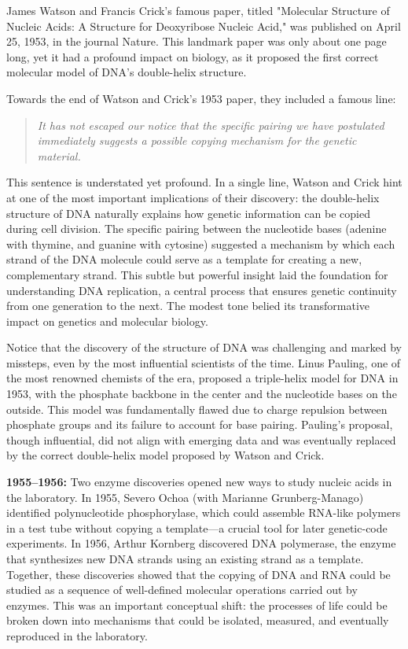 James Watson and Francis Crick's famous paper, titled "Molecular Structure of Nucleic Acids: A Structure for Deoxyribose Nucleic Acid," was published on April 25, 1953, in the journal Nature. This landmark paper was only about one page long, yet it had a profound impact on biology, as it proposed the first correct molecular model of DNA's double-helix structure.

Towards the end of Watson and Crick's 1953 paper, they included a famous line:
\begin{quote}
    \textit{It has not escaped our notice that the specific pairing we have postulated immediately suggests a possible copying mechanism for the genetic material.}
\end{quote}
This sentence is understated yet profound. In a single line, Watson and Crick hint at one of the most important implications of their discovery: the double-helix structure of DNA naturally explains how genetic information can be copied during cell division. The specific pairing between the nucleotide bases (adenine with thymine, and guanine with cytosine) suggested a mechanism by which each strand of the DNA molecule could serve as a template for creating a new, complementary strand. This subtle but powerful insight laid the foundation for understanding DNA replication, a central process that ensures genetic continuity from one generation to the next. The modest tone belied its transformative impact on genetics and molecular biology.

Notice that the discovery of the structure of DNA was challenging and marked by missteps, even by the most influential scientists of the time. Linus Pauling, 
one of the most renowned chemists of the era, proposed a triple-helix model for DNA in 1953, with the phosphate backbone in the center and the nucleotide bases on the outside. This model was fundamentally flawed due to charge repulsion between phosphate groups and its failure to account for base pairing. Pauling's proposal, though influential, did not align with emerging data and was eventually replaced by the correct double-helix model proposed by Watson and Crick.

\medskip\noindent\textbf{1955--1956:} Two enzyme discoveries opened new ways to study nucleic acids in the laboratory. In 1955, Severo Ochoa (with Marianne Grunberg-Manago) identified polynucleotide phosphorylase, which could assemble RNA-like polymers in a test tube without copying a template---a crucial tool for later genetic-code experiments. In 1956, Arthur Kornberg discovered DNA polymerase, the enzyme that synthesizes new DNA strands using an existing strand as a template. Together, these discoveries showed that the copying of DNA and RNA could be studied as a sequence of well-defined molecular operations carried out by enzymes. This was an important conceptual shift: the processes of life could be broken down into mechanisms that could be isolated, measured, and eventually reproduced in the laboratory.

